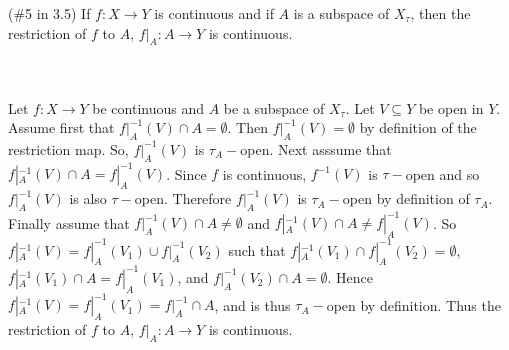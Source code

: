 (\#5 in 3.5) If $f:X\to Y$ is continuous and if $A$ is a subspace of $X_{\tau}$, then the restriction
of $f$ to $A$, $f|_{A}:A\to Y$ is continuous.\\\\

\begin{solution}\renewcommand{\qedsymbol}{}\ \\
    Let $f:X\to Y$ be continuous and $A$ be a subspace of $X_{\tau}$. Let $V\subseteq Y$ be open in $Y$.
    Assume first that $f|_{A}^{-1}(V)\cap A=\emptyset$. Then $f|_{A}^{-1}(V)=\emptyset$ by definition of
    the restriction map. So, $f|_{A}^{-1}(V)$ is $\tau_{A}-$open. Next asssume that
    $f|_{A}^{-1}(V)\cap A=f|_{A}^{-1}(V)$. Since $f$ is continuous, $f^{-1}(V)$ is $\tau-$open and so
    $f|_{A}^{-1}(V)$ is also $\tau-$open. Therefore $f|_{A}^{-1}(V)$ is $\tau_{A}-$open by definition of
    $\tau_{A}$. Finally assume that $f|_{A}^{-1}(V)\cap A\neq\emptyset$ and
    $f|_{A}^{-1}(V)\cap A\neq f|_{A}^{-1}(V)$. So $f|_{A}^{-1}(V)=f|_{A}^{-1}(V_1)\cup f|_{A}^{-1}(V_2)$
    such that
    $f|_{A}^{-1}(V_1)\cap f|_{A}^{-1}(V_2)=\emptyset$, $f|_{A}^{-1}(V_1)\cap A=f|_{A}^{-1}(V_1)$, and
    $f|_{A}^{-1}(V_2)\cap A=\emptyset$. Hence $f|_{A}^{-1}(V)=f|_{A}^{-1}(V_1)=f|_{A}^{-1}\cap A$, and
    is thus $\tau_{A}-$open by definition. Thus the restriction of $f$ to $A$, $f|_{A}:A\to Y$ is
    continuous.

\end{solution}